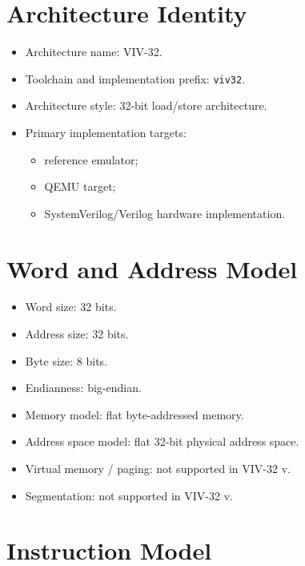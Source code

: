 \section{Architecture Identity}

\begin{itemize}
  \item Architecture name: VIV-32.
  \item Toolchain and implementation prefix: \texttt{viv32}.
  \item Architecture style: 32-bit load/store architecture.
  \item Primary implementation targets:
  \begin{itemize}
    \item reference emulator;
    \item QEMU target;
    \item SystemVerilog/Verilog hardware implementation.
  \end{itemize}
\end{itemize}

\section{Word and Address Model}

\begin{itemize}
  \item Word size: 32 bits.
  \item Address size: 32 bits.
  \item Byte size: 8 bits.
  \item Endianness: big-endian.
  \item Memory model: flat byte-addressed memory.
  \item Address space model: flat 32-bit physical address space.
  \item Virtual memory / paging: not supported in VIV-32 v\version{}.
  \item Segmentation: not supported in VIV-32 v\version{}.
\end{itemize}

\section{Instruction Model}

